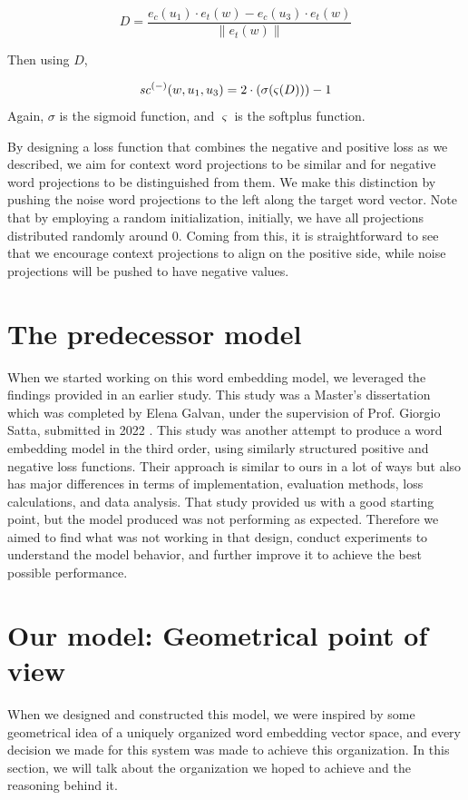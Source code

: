 \[ D = \frac{e_c(u_1) \cdot e_t(w) - e_c(u_3) \cdot e_t(w)}{\left \| e_t(w) \right \|}\]

Then using $D$,

\[ \mathit{sc}^{({-})}({w, u_1, u_3}) = 2 \cdot (\sigma( \varsigma  (D) )) - 1\]
\noindent
Again, $\sigma$ is the sigmoid function, and $\varsigma$ is the softplus function.

By designing a loss function that combines the negative and positive loss as we described, we aim for context word projections to be similar and for negative word projections to be distinguished from them. We make this distinction by pushing the noise word projections to the left along the target word vector. Note that by employing a random initialization, initially, we have all projections distributed randomly around $0$. Coming from this, it is straightforward to see that we encourage context projections to align on the positive side, while noise projections will be pushed to have negative values.

\section{The predecessor model}

When we started working on this word embedding model, we leveraged the findings provided in an earlier study. This study was a Master's dissertation which was completed by Elena Galvan, under the supervision of Prof. Giorgio Satta, submitted in 2022 \cite{galvan}. This study was another attempt to produce a word embedding model in the third order, using similarly structured positive and negative loss functions. Their approach is similar to ours in a lot of ways but also has major differences in terms of implementation, evaluation methods, loss calculations, and data analysis. That study provided us with a good starting point, but the model produced was not performing as expected. Therefore we aimed to find what was not working in that design, conduct experiments to understand the model behavior, and further improve it to achieve the best possible performance.



\section{Our model: Geometrical point of view}

When we designed and constructed this model, we were inspired by some geometrical idea of a uniquely organized word embedding vector space, and every decision we made for this system was made to achieve this organization. In this section, we will talk about the organization we hoped to achieve and the reasoning behind it.

